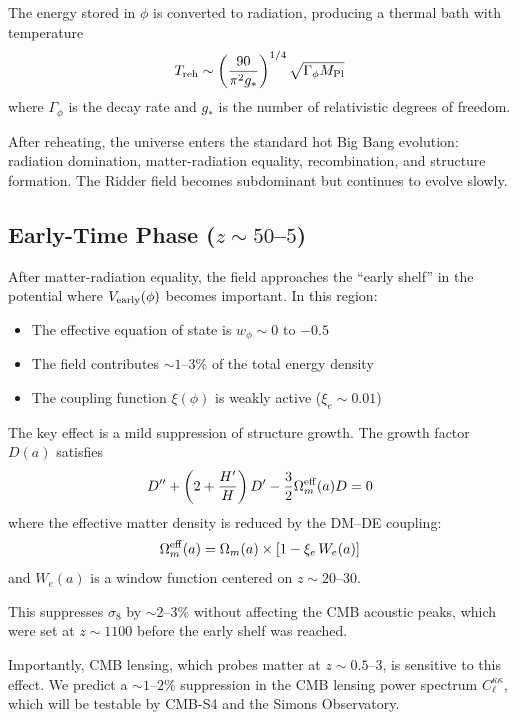 \documentclass[twocolumn,showpacs,preprintnumbers,amsmath,amssymb,prd]{revtex4-2}
\begin{document}
The energy stored in $\phi$ is converted to radiation, producing a thermal bath with temperature
\begin{equation}
T_{\rm reh} \sim \left(\frac{90}{\pi^2 g_*}\right)^{1/4} \sqrt{\Gamma_\phi M_{\rm Pl}}
\end{equation}
where $\Gamma_\phi$ is the decay rate and $g_*$ is the number of relativistic degrees of freedom.

After reheating, the universe enters the standard hot Big Bang evolution: radiation domination, matter-radiation equality, recombination, and structure formation. The Ridder field becomes subdominant but continues to evolve slowly.

\subsection{Early-Time Phase ($z \sim 50$--$5$)}

After matter-radiation equality, the field approaches the ``early shelf'' in the potential where $V_{\rm early}(\phi)$ becomes important. In this region:
\begin{itemize}
    \item The effective equation of state is $w_\phi \sim 0$ to $-0.5$
    \item The field contributes $\sim 1$--$3\%$ of the total energy density
    \item The coupling function $\xi(\phi)$ is weakly active ($\xi_e \sim 0.01$)
\end{itemize}

The key effect is a mild suppression of structure growth. The growth factor $D(a)$ satisfies
\begin{equation}
D'' + \left(2 + \frac{H'}{H}\right)D' - \frac{3}{2}\Omega_m^{\rm eff}(a) D = 0
\end{equation}
where the effective matter density is reduced by the DM--DE coupling:
\begin{equation}
\Omega_m^{\rm eff}(a) = \Omega_m(a) \times \left[1 - \xi_e \, W_e(a)\right]
\end{equation}
and $W_e(a)$ is a window function centered on $z \sim 20$--$30$.

This suppresses $\sigma_8$ by $\sim 2$--$3\%$ without affecting the CMB acoustic peaks, which were set at $z \sim 1100$ before the early shelf was reached.

Importantly, CMB lensing, which probes matter at $z \sim 0.5$--$3$, is sensitive to this effect. We predict a $\sim 1$--$2\%$ suppression in the CMB lensing power spectrum $C_\ell^{\kappa\kappa}$, which will be testable by CMB-S4 and the Simons Observatory.
\end{document}
